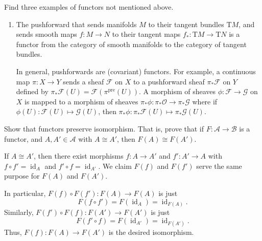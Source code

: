 \documentclass[12 pt, letterpaper]{hmcpset}
\begin{document}
\begin{problem}[1.2.20]
	Find three examples of functors not mentioned above.
\end{problem}

\begin{solution}
	\begin{enumerate}[label = (\arabic*)]
		\item The pushforward that sends manifolds $M$ to their tangent bundles $\mathrm{T} M$, and sends smooth maps $f : M \to N$ to their tangent maps $f_{*} : \mathrm{T} M \to \mathrm{T} N$ is a functor from the category of smooth manifolds to the category of tangent bundles.

			In general, pushforwards are (covariant) functors. For example, a continuous map $\pi : X \to Y$ sends a sheaf $\mathscr{F}$ on $X$ to a pushforward sheaf $\pi_{*} \mathscr{F}$ on $Y$ defined by $\pi_{*} \mathscr{F}(U) = \mathscr{F}(\pi^{\text{pre}}(U))$. A morphism of sheaves $\phi : \mathscr{F} \to \mathscr{G}$ on $X$ is mapped to a morphism of sheaves $\pi_{*} \phi : \pi_{*} \mathscr{O} \to \pi_{*} \mathscr{G}$ where if $\phi(U) : \mathscr{F}(U) \mapsto \mathscr{G}(U)$, then $\pi_{*} \phi : \pi_{*} \mathscr{F}(U) \mapsto \pi_{*} \mathscr{G}(U)$.
	\end{enumerate}
\end{solution}

\pagebreak

\begin{problem}[1.2.21]
	Show that functors preserve isomorphism. That is, prove that if $F : \mathscr{A} \to \mathscr{B}$ is a functor, and $A, A' \in \mathscr{A}$ with $A \cong A'$, then $F(A) \cong F(A')$.
\end{problem}

\begin{solution}
	If $A \cong A'$, then there exist morphisms $f : A \to A'$ and $f' : A' \to A$ with $f \circ f' = \operatorname{id}_{A}$ and $f' \circ f = \operatorname{id}_{A'}$. We claim $F(f)$ and $F(f')$ serve the same purpose for $F(A)$ and $F(A')$.

	In particular, $F(f) \circ F(f') : F(A) \to F(A)$ is just
	\[
		F(f \circ f') = F(\operatorname{id}_{A}) = \operatorname{id}_{F(A)}.
	\]
	Similarly, $F(f') \circ F(f) : F(A') \to F(A')$ is just 
	\[
		F(f' \circ f) = F(\operatorname{id}_{A'}) = \operatorname{id}_{F(A')}.
	\]
	Thus, $F(f) : F(A) \to F(A')$ is the desired isomorphism.
\end{solution}

\pagebreak
\end{document}
